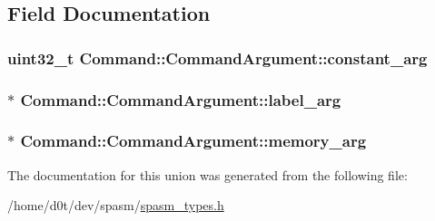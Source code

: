 \subsection{\-Field \-Documentation}
\hypertarget{union_command_1_1_command_argument_abac24a4437e622f24b8667b66db36839}{
\subsubsection[{constant\-\_\-arg}]{\setlength{\rightskip}{0pt plus 5cm}uint32\-\_\-t {\bf \-Command\-::\-Command\-Argument\-::constant\-\_\-arg}}}\label{union_command_1_1_command_argument_abac24a4437e622f24b8667b66db36839}
\hypertarget{union_command_1_1_command_argument_ad35f7f6890ba7afda2f6df885c80ee1b}{
\subsubsection[{label\-\_\-arg}]{$\ast$ {\bf \-Command\-::\-Command\-Argument\-::label\-\_\-arg}}}\label{union_command_1_1_command_argument_ad35f7f6890ba7afda2f6df885c80ee1b}
\hypertarget{union_command_1_1_command_argument_aa1d92797db179e44197eb21140e4d207}{
\subsubsection[{memory\-\_\-arg}]{$\ast$ {\bf \-Command\-::\-Command\-Argument\-::memory\-\_\-arg}}}\label{union_command_1_1_command_argument_aa1d92797db179e44197eb21140e4d207}


\-The documentation for this union was generated from the following file\-:\begin{DoxyCompactItemize}
\item 
/home/d0t/dev/spasm/\hyperlink{spasm__types_8h}{spasm\-\_\-types.\-h}\end{DoxyCompactItemize}
